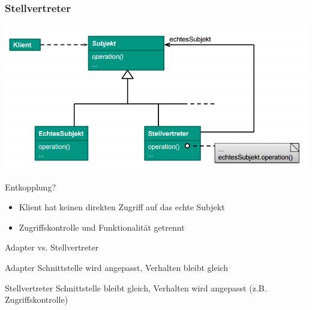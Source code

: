 \documentclass[18pt]{beamer}
\begin{document}
	\begin{frame}
		\frametitle{Stellvertreter}
		\centering
		\includegraphics[scale=0.4]{./pics/tut3/prox.png}
		\begin{block}{Entkopplung?}
			\begin{itemize}
				\pause 
				\item Klient hat keinen direkten Zugriff auf das echte Subjekt
				\item Zugriffskontrolle und Funktionalität getrennt
			\end{itemize}
		\end{block}
	\end{frame}

\begin{frame}{Adapter vs. Stellvertreter}
	\begin{block}{Adapter}
		Schnittstelle wird angepasst, Verhalten bleibt gleich
	\end{block}
	\begin{block}{Stellvertreter}
		Schnittstelle bleibt gleich, Verhalten wird angepasst (z.B. Zugriffskontrolle)
	\end{block}
\end{frame}


	
\end{document}
